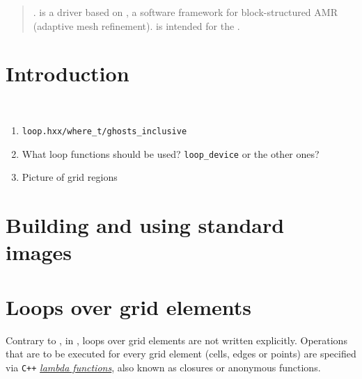 \begin{abstract}

. \CarpetX\space is a \href{https://www.cactuscode.org/index.html}{\Cactus} driver based on \href{https://amrex-codes.github.io/}{\AMReX}, a software framework for block-structured AMR (adaptive mesh refinement). \CarpetX\space is intended for the \href{https://einsteintoolkit.org/}{\ETK}.

\end{abstract}

\newpage


\section{Introduction}
\label{sec:intro}

\\

\begin{enumerate}
    \item \texttt{loop.hxx/where\_t/ghosts\_inclusive}
    \item What loop functions should be used? \texttt{loop\_device} or the other ones?
    \item Picture of grid regions
\end{enumerate}

\section{Building and using standard images}
\label{sec:std_imgs}

\section{Loops over grid elements}
\label{sec:loops}

Contrary to \Carpet, in \CarpetX, loops over grid elements are not written explicitly. Operations that are to be executed for every grid element (cells, edges or points) are specified via \texttt{C++} \href{https://en.cppreference.com/w/cpp/language/lambda}{\textit{lambda functions}}, also known as closures or anonymous functions.

